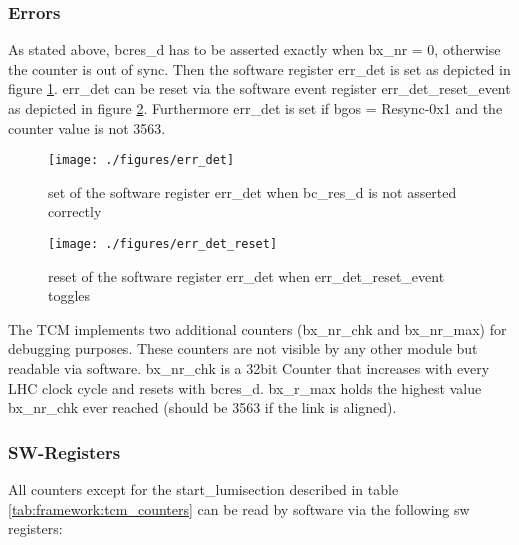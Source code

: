 \subsubsection{Errors}\label{subsec:framework:tcmerrors}
As stated above, bcres\_d has to be asserted exactly when bx\_nr = 0, otherwise the counter is out of sync. Then the software register err\_det is set as depicted in figure \ref{fig:err_det}. err\_det can be reset via the software event register err\_det\_reset\_event as depicted in figure \ref{fig:err_det_reset}. Furthermore err\_det is set if bgos = Resync-0x1 and the counter value is not 3563.

\begin{figure}[ht]
  \texttt{[image: ./figures/err\_det]}
  \caption{set of the software register err\_det when bc\_res\_d is not asserted correctly}
  \label{fig:err_det}
\end{figure}

\begin{figure}[ht]
  \texttt{[image: ./figures/err\_det\_reset]}
  \caption{reset of the software register err\_det when err\_det\_reset\_event toggles}
  \label{fig:err_det_reset}
\end{figure}

The TCM implements two additional counters (bx\_nr\_chk and bx\_nr\_max) for debugging purposes. These counters are not visible by any other module but readable via software. bx\_nr\_chk is a 32bit Counter that increases with every LHC clock cycle and resets with bcres\_d. bx\_r\_max holds the highest value bx\_nr\_chk ever reached (should be 3563 if the link is aligned).

\subsubsection{SW-Registers}
All counters except for the start\_lumisection described in table \ref{tab:framework:tcm_counters} can be read by software via the following sw registers:

